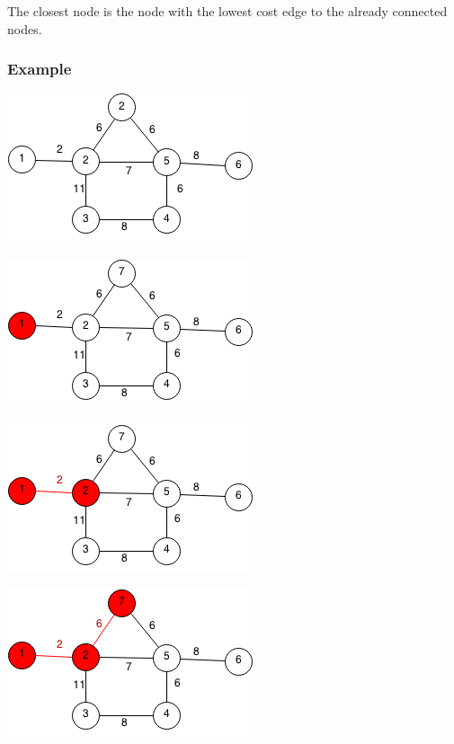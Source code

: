 \documentclass[11pt,oneside]{book}
\makeatletter
\def\maxwidth#1{\ifdim\Gin@nat@width>#1 #1\else\Gin@nat@width\fi}
\makeatother
\begin{document}
The closest node is the node with the lowest cost edge to the already connected nodes.

\subsubsection{Example}

\vspace{5px}\includegraphics[width=\maxwidth{\textwidth}]{prim.png}

\vspace{5px}\includegraphics[width=\maxwidth{\textwidth}]{prim1.png}

\vspace{5px}\includegraphics[width=\maxwidth{\textwidth}]{prim2.png}

\vspace{5px}\includegraphics[width=\maxwidth{\textwidth}]{prim3.png}
\end{document}
